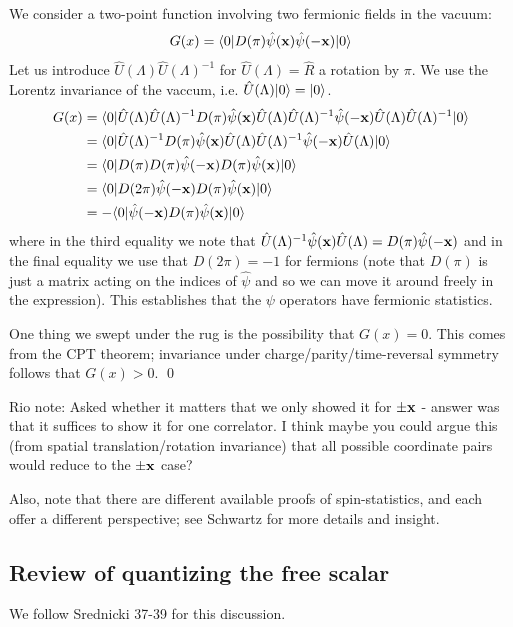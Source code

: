 We consider a two-point function involving two fermionic fields in the vacuum:
\begin{equation}
    G(x) = \langle 0 \rvert D(\pi)\hat{\psi}(\mathbf{x})\hat{\psi}(-\mathbf{x})\lvert 0 \rangle
\end{equation}
Let us introduce $\hat{U}(\Lambda)\hat{U}(\Lambda)^{-1}$ for $\hat{U}(\Lambda) = \hat{R}$ a rotation by $\pi$. We use the Lorentz invariance of the vaccum, i.e. $\hat{U}(\Lambda)\lvert 0 \rangle = \lvert 0 \rangle$.
\begin{equation}
    \begin{split}
        G(x) &= \langle 0 \rvert\hat{U}(\Lambda)\hat{U}(\Lambda)^{-1}D(\pi)\hat{\psi}(\mathbf{x})\hat{U}(\Lambda)\hat{U}(\Lambda)^{-1}\hat{\psi}(-\mathbf{x})\hat{U}(\Lambda)\hat{U}(\Lambda)^{-1}\lvert 0 \rangle 
        \\ &= \langle 0 \rvert\hat{U}(\Lambda)^{-1}D(\pi)\hat{\psi}(\mathbf{x})\hat{U}(\Lambda)\hat{U}(\Lambda)^{-1}\hat{\psi}(-\mathbf{x})\hat{U}(\Lambda)\lvert 0 \rangle
        \\ &= \langle 0 \rvert D(\pi)D(\pi)\hat{\psi}(-\mathbf{x})D(\pi)\hat{\psi}(\mathbf{x})\lvert 0 \rangle
        \\ &= \langle 0 \rvert D(2\pi)\hat{\psi}(-\mathbf{x})D(\pi)\hat{\psi}(\mathbf{x})\lvert 0 \rangle
        \\ &= -\langle 0 \rvert\hat{\psi}(-\mathbf{x})D(\pi)\hat{\psi}(\mathbf{x})\lvert 0 \rangle
    \end{split}
\end{equation}
where in the third equality we note that $\hat{U}(\Lambda)^{-1}\hat{\psi}(\mathbf{x})\hat{U}(\Lambda) = D(\pi)\hat{\psi}(-\mathbf{x})$ and in the final equality we use that $D(2\pi) = -1$ for fermions (note that $D(\pi)$ is just a matrix acting on the indices of $\hat{\psi}$ and so we can move it around freely in the expression). This establishes that the $\psi$ operators have fermionic statistics.

One thing we swept under the rug is the possibility that $G(x) = 0$. This comes from the CPT theorem; invariance under charge/parity/time-reversal symmetry follows that $G(x) > 0$. \qed

Rio note: Asked whether it matters that we only showed it for $\pm \mathbf{x}$ - answer was that it suffices to show it for one correlator. I think maybe you could argue this (from spatial translation/rotation invariance) that all possible coordinate pairs would reduce to the $\pm \mathbf{x}$ case?

Also, note that there are different available proofs of spin-statistics, and each offer a different perspective; see Schwartz for more details and insight.

\subsection{Review of quantizing the free scalar}
We follow Srednicki 37-39 for this discussion.

